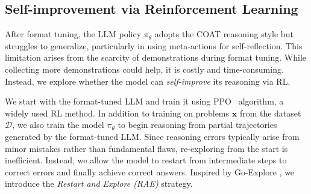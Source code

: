 \subsection{Self-improvement via Reinforcement Learning} \label{subsec:rl}

After format tuning, the LLM policy \(\pi_\theta\) adopts the COAT reasoning style but struggles to generalize, particularly in using meta-actions for self-reflection. This limitation arises from the scarcity of demonstrations during format tuning. While collecting more demonstrations could help, it is costly and time-consuming. Instead, we explore whether the model can \textit{self-improve} its reasoning via RL.

We start with the format-tuned LLM and train it using PPO~\citep{schulman2017proximal} algorithm, a widely used RL method. In addition to training on problems \( \boldsymbol{x} \) from the dataset \( \mathcal{D} \), we also train the model \( \pi_\theta \) to begin reasoning from partial trajectories generated by the format-tuned LLM. Since reasoning errors typically arise from minor mistakes rather than fundamental flaws, re-exploring from the start is inefficient. Instead, we allow the model to restart from intermediate steps to correct errors and finally achieve correct answers. Inspired by Go-Explore \citep{ecoffet2019go}, we introduce the \textit{Restart and Explore (RAE)} strategy.

